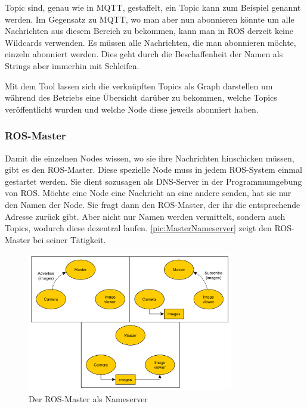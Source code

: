 Topic sind, genau wie in MQTT, gestaffelt, ein Topic kann zum Beispiel  genannt werden. Im Gegensatz zu MQTT, wo man aber nun  abonnieren könnte um alle Nachrichten aus diesem Bereich zu bekommen, kann man in \ac{ROS} derzeit keine Wildcards verwenden. Es müssen alle Nachrichten, die man abonnieren möchte, einzeln abonniert werden. Dies geht durch die Beschaffenheit der Namen als Strings aber immerhin mit Schleifen.

Mit dem Tool \cite{ROS_RQT} lassen sich die verknüpften Topics als Graph darstellen um während des Betriebs eine Übersicht darüber zu bekommen, welche Topics veröffentlicht wurden und welche Node diese jeweils abonniert haben.

\subsubsection*{ROS-Master}


Damit die einzelnen Nodes wissen, wo sie ihre Nachrichten hinschicken müssen, gibt es den \ac{ROS}-Master\cite{ROS_MASTER}. Diese spezielle Node muss in jedem \ac{ROS}-System einmal gestartet werden. Sie dient sozusagen als DNS-Server in der Programmumgebung von \ac{ROS}. Möchte eine Node eine Nachricht an eine andere senden, hat sie nur den Namen der Node. Sie fragt dann den \ac{ROS}-Master, der ihr die entsprechende Adresse zurück gibt. Aber nicht nur Namen werden vermittelt, sondern auch Topics, wodurch diese dezentral laufen. \autoref{pic:MasterNameserver} zeigt den \ac{ROS}-Master bei seiner Tätigkeit.

\begin{figure}[h]
	\centering
	\includegraphics[width=0.8\textwidth,keepaspectratio]{graphics/MasterNameserver.png}
	\caption{Der ROS-Master als Nameserver}
	\label{pic:MasterNameserver}
\end{figure}

